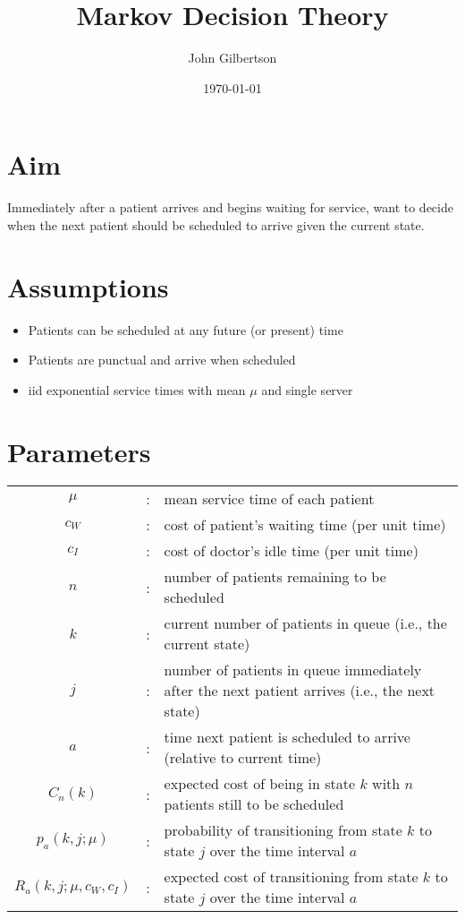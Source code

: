 \documentclass{article}
\title{Markov Decision Theory}
\author{John Gilbertson}
\date{\today}
\begin{document}
\maketitle

\tableofcontents

\newpage

\section{Aim}

Immediately after a patient arrives and begins waiting for service, want to decide when the next patient should be scheduled to arrive given the current state.

\section{Assumptions}

\begin{itemize}
	\item Patients can be scheduled at any future (or present) time
	\item Patients are punctual and arrive when scheduled
	\item iid exponential service times with mean $\mu$ and single server
\end{itemize}

\section{Parameters}

\begin{tabularx}{\textwidth}{c c X}
	$\mu$ & : & mean service time of each patient \\
	$c_{W}$ & : & cost of patient's waiting time (per unit time) \\
	$c_{I}$ & : & cost of doctor's idle time (per unit time) \\
	$n$ & : & number of patients remaining to be scheduled \\
	$k$ & : & current number of patients in queue (i.e., the current state) \\
	$j$ & : & number of patients in queue immediately after the next patient arrives (i.e., the next state) \\
	$a$ & : & time next patient is scheduled to arrive (relative to current time) \\
	$C_{n} (k)$ & : & expected cost of being in state $k$ with $n$ patients still to be scheduled \\
	$p_{a} (k, j; \mu)$ & : & probability of transitioning from state $k$ to state $j$ over the time interval $a$ \\
	$R_{a} (k, j; \mu, c_{W}, c_{I})$ & : & expected cost of transitioning from state $k$ to state $j$ over the time interval $a$ \\
\end{tabularx}
\end{document}
